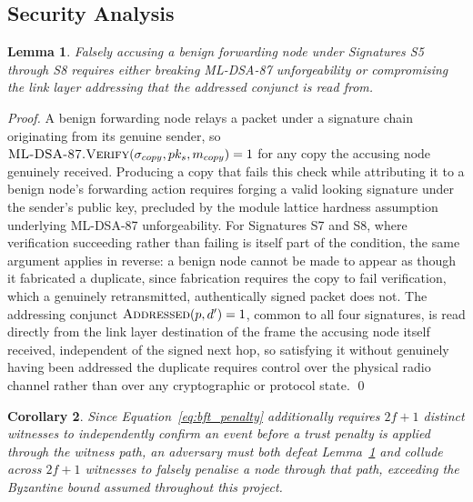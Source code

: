 \documentclass[final,5p,twocolumn]{elsarticle}
\newtheorem{lemma}{Lemma}
\newtheorem{corollary}[lemma]{Corollary}
\theoremstyle{remark}
\theoremstyle{plain}
\begin{document}
\subsection{Security Analysis}
\label{app:security}

\begin{lemma}
	\label{lem:s5_unforgeability}
	Falsely accusing a benign forwarding node under Signatures S5 through
	S8 requires either breaking ML-DSA-87 unforgeability or compromising
	the link layer addressing that the addressed conjunct is read from.
\end{lemma}
\begin{proof}
	A benign forwarding node relays a packet under a signature chain
	originating from its genuine sender, so
	$\textsc{ML-DSA-87.Verify}(\sigma_{copy},pk_s,m_{copy})=1$ for any copy
	the accusing node genuinely received. Producing a copy that fails this
	check while attributing it to a benign node's forwarding action
	requires forging a valid looking signature under the sender's public
	key, precluded by the module lattice hardness assumption underlying
	ML-DSA-87 unforgeability. For Signatures S7 and S8, where verification
	succeeding rather than failing is itself part of the condition, the
	same argument applies in reverse: a benign node cannot be made to
	appear as though it fabricated a duplicate, since fabrication requires
	the copy to fail verification, which a genuinely retransmitted,
	authentically signed packet does not. The addressing conjunct
	$\textsc{Addressed}(p,d')=1$, common to all four signatures, is read
	directly from the link layer destination of the frame the accusing
	node itself received, independent of the signed next hop, so
	satisfying it without genuinely having been addressed the duplicate
	requires control over the physical radio channel rather than over any
	cryptographic or protocol state.
	\qed
\end{proof}

\begin{corollary}
	Since Equation~\eqref{eq:bft_penalty} additionally requires $2f{+}1$
	distinct witnesses to independently confirm an event before a trust
	penalty is applied through the witness path, an adversary must both
	defeat Lemma~\ref{lem:s5_unforgeability} and collude across $2f{+}1$
	witnesses to falsely penalise a node through that path, exceeding the
	Byzantine bound assumed throughout this project.
\end{corollary}
\end{document}
